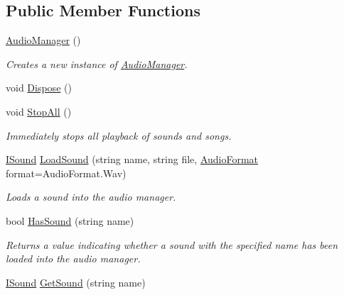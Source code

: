 \subsection*{Public Member Functions}
\begin{DoxyCompactItemize}
\item 
\hyperlink{class_tri_devs_1_1_tri_engine_1_1_audio_1_1_audio_manager_a87fb91e76fb20ceb35204dc4b755d0fd}{Audio\-Manager} ()
\begin{DoxyCompactList}\small\item\em Creates a new instance of \hyperlink{class_tri_devs_1_1_tri_engine_1_1_audio_1_1_audio_manager}{Audio\-Manager}. \end{DoxyCompactList}\item 
void \hyperlink{class_tri_devs_1_1_tri_engine_1_1_audio_1_1_audio_manager_ac2178ef14673d624a13a13dc089c1ec2}{Dispose} ()
\item 
void \hyperlink{class_tri_devs_1_1_tri_engine_1_1_audio_1_1_audio_manager_ab69a84df74dae9b250d8bbb062bd05b2}{Stop\-All} ()
\begin{DoxyCompactList}\small\item\em Immediately stops all playback of sounds and songs. \end{DoxyCompactList}\item 
\hyperlink{interface_tri_devs_1_1_tri_engine_1_1_audio_1_1_i_sound}{I\-Sound} \hyperlink{class_tri_devs_1_1_tri_engine_1_1_audio_1_1_audio_manager_ad81ae1b7d074183ac0424f795a7a1213}{Load\-Sound} (string name, string file, \hyperlink{namespace_tri_devs_1_1_tri_engine_1_1_audio_a3e1817498a8306afd084903a967537ef}{Audio\-Format} format=Audio\-Format.\-Wav)
\begin{DoxyCompactList}\small\item\em Loads a sound into the audio manager. \end{DoxyCompactList}\item 
bool \hyperlink{class_tri_devs_1_1_tri_engine_1_1_audio_1_1_audio_manager_af62a5fb8b964b687cc26feca23edc1ef}{Has\-Sound} (string name)
\begin{DoxyCompactList}\small\item\em Returns a value indicating whether a sound with the specified name has been loaded into the audio manager. \end{DoxyCompactList}\item 
\hyperlink{interface_tri_devs_1_1_tri_engine_1_1_audio_1_1_i_sound}{I\-Sound} \hyperlink{class_tri_devs_1_1_tri_engine_1_1_audio_1_1_audio_manager_a39ccb0904481097723bec271ce4c720f}{Get\-Sound} (string name)

\end{DoxyCompactItemize}
